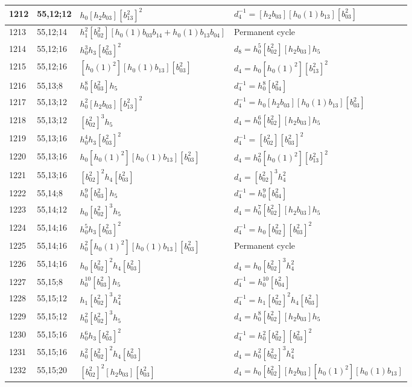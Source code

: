 \documentclass{article}
\begin{document}
\begin{longtable}{|l|l|>{\raggedright\arraybackslash}p{6cm}|>{\raggedright\arraybackslash}p{6cm}|}
\hline
1212 & 55,12;12 & $h_0[h_2b_{03}][b_{13}^2]^2$ & $d_{4}^{-1}=[h_2b_{03}][h_0(1)b_{13}][b_{03}^2]$\\
\hline
1213 & 55,12;14 & $h_1^2[b_{02}^2][h_0(1)b_{03}b_{14} + h_0(1)b_{13}b_{04}]$ & Permanent cycle\\
\hline
1214 & 55,12;16 & $h_0^3h_3[b_{03}^2]^2$ &$d_{8}=h_0^5[b_{02}^2][h_2b_{03}]h_5$\\
1215 & 55,12;16 & $[h_0(1)^2][h_0(1)b_{13}][b_{03}^2]$ &$d_{4}=h_0[h_0(1)^2][b_{13}^2]^2$\\
\hline
1216 & 55,13;8 & $h_0^8[b_{03}^2]h_5$ & $d_{4}^{-1}=h_0^8[b_{04}^2]$\\
\hline
1217 & 55,13;12 & $h_0^2[h_2b_{03}][b_{13}^2]^2$ & $d_{4}^{-1}=h_0[h_2b_{03}][h_0(1)b_{13}][b_{03}^2]$\\
1218 & 55,13;12 & $[b_{02}^2]^3h_5$ &$d_{4}=h_0^6[b_{02}^2][h_2b_{03}]h_5$\\
\hline
1219 & 55,13;16 & $h_0^4h_3[b_{03}^2]^2$ & $d_{4}^{-1}=[b_{02}^2][b_{03}^2]^2$\\
1220 & 55,13;16 & $h_0[h_0(1)^2][h_0(1)b_{13}][b_{03}^2]$ &$d_{4}=h_0^2[h_0(1)^2][b_{13}^2]^2$\\
1221 & 55,13;16 & $[b_{02}^2]^2h_4[b_{03}^2]$ &$d_{4}=[b_{02}^2]^3h_4^2$\\
\hline
1222 & 55,14;8 & $h_0^9[b_{03}^2]h_5$ & $d_{4}^{-1}=h_0^9[b_{04}^2]$\\
\hline
1223 & 55,14;12 & $h_0[b_{02}^2]^3h_5$ &$d_{4}=h_0^7[b_{02}^2][h_2b_{03}]h_5$\\
\hline
1224 & 55,14;16 & $h_0^5h_3[b_{03}^2]^2$ & $d_{4}^{-1}=h_0[b_{02}^2][b_{03}^2]^2$\\
1225 & 55,14;16 & $h_0^2[h_0(1)^2][h_0(1)b_{13}][b_{03}^2]$ & Permanent cycle\\
1226 & 55,14;16 & $h_0[b_{02}^2]^2h_4[b_{03}^2]$ &$d_{4}=h_0[b_{02}^2]^3h_4^2$\\
\hline
1227 & 55,15;8 & $h_0^{10}[b_{03}^2]h_5$ & $d_{4}^{-1}=h_0^{10}[b_{04}^2]$\\
\hline
1228 & 55,15;12 & $h_1[b_{02}^2]^3h_4^2$ & $d_{4}^{-1}=h_1[b_{02}^2]^2h_4[b_{03}^2]$\\
1229 & 55,15;12 & $h_0^2[b_{02}^2]^3h_5$ &$d_{4}=h_0^8[b_{02}^2][h_2b_{03}]h_5$\\
\hline
1230 & 55,15;16 & $h_0^6h_3[b_{03}^2]^2$ & $d_{4}^{-1}=h_0^2[b_{02}^2][b_{03}^2]^2$\\
1231 & 55,15;16 & $h_0^2[b_{02}^2]^2h_4[b_{03}^2]$ &$d_{4}=h_0^2[b_{02}^2]^3h_4^2$\\
\hline
1232 & 55,15;20 & $[b_{02}^2]^2[h_2b_{03}][b_{03}^2]$ &$d_{4}=h_0[b_{02}^2][h_2b_{03}][h_0(1)^2][h_0(1)b_{13}]$\\

\end{longtable}
\end{document}
